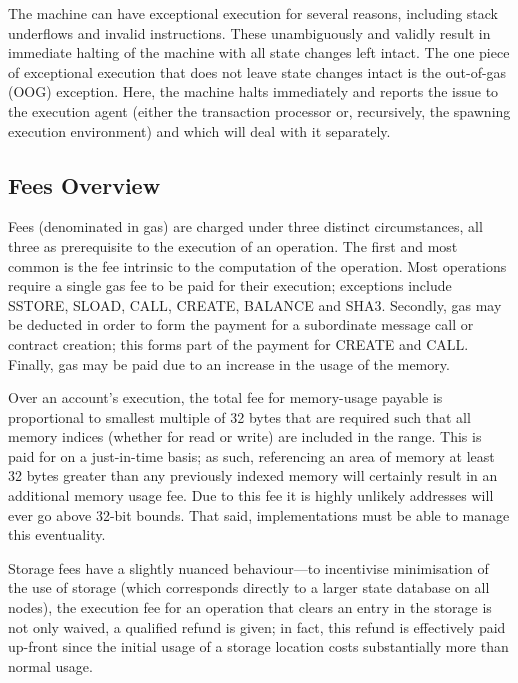 \documentclass[9pt,oneside]{amsart}
\begin{document}
\begin{multicols}{2}
The machine can have exceptional execution for several reasons, including stack underflows and invalid instructions. These unambiguously and validly result in immediate halting of the machine with all state changes left intact. The one piece of exceptional execution that does not leave state changes intact is the out-of-gas (OOG) exception. Here, the machine halts immediately and reports the issue to the execution agent (either the transaction processor or, recursively, the spawning execution environment) and which will deal with it separately.

\subsection{Fees Overview}

Fees (denominated in gas) are charged under three distinct circumstances, all three as prerequisite to the execution of an operation. The first and most common is the fee intrinsic to the computation of the operation. Most operations require a single gas fee to be paid for their execution; exceptions include {\small SSTORE}, {\small SLOAD}, {\small CALL}, {\small CREATE}, {\small BALANCE} and {\small SHA3}. Secondly, gas may be deducted in order to form the payment for a subordinate message call or contract creation; this forms part of the payment for {\small CREATE} and {\small CALL}. Finally, gas may be paid due to an increase in the usage of the memory.

Over an account's execution, the total fee for memory-usage payable is proportional to smallest multiple of 32 bytes that are required such that all memory indices (whether for read or write) are included in the range. This is paid for on a just-in-time basis; as such, referencing an area of memory at least 32 bytes greater than any previously indexed memory will certainly result in an additional memory usage fee. Due to this fee it is highly unlikely addresses will ever go above 32-bit bounds. That said, implementations must be able to manage this eventuality.

Storage fees have a slightly nuanced behaviour---to incentivise minimisation of the use of storage (which corresponds directly to a larger state database on all nodes), the execution fee for an operation that clears an entry in the storage is not only waived, a qualified refund is given; in fact, this refund is effectively paid up-front since the initial usage of a storage location costs substantially more than normal usage.


\end{multicols}
\end{document}
